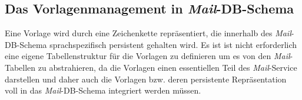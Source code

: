 \subsection{Das Vorlagenmanagement in \emph{Mail}-DB-Schema}
Eine Vorlage wird durch eine Zeichenkette repräsentiert, die innerhalb des \emph{Mail}-DB-Schema sprachspezifisch  persistent gehalten wird. Es ist ist nicht erforderlich eine eigene Tabellenstruktur für die Vorlagen zu definieren um es von den \emph{Mail}-Tabellen zu abstrahieren, da die Vorlagen einen essentiellen Teil des \emph{Mail}-Service darstellen und daher auch die Vorlagen bzw. deren persistente Repräsentation voll in das \emph{Mail}-DB-Schema  integriert werden müssen.
